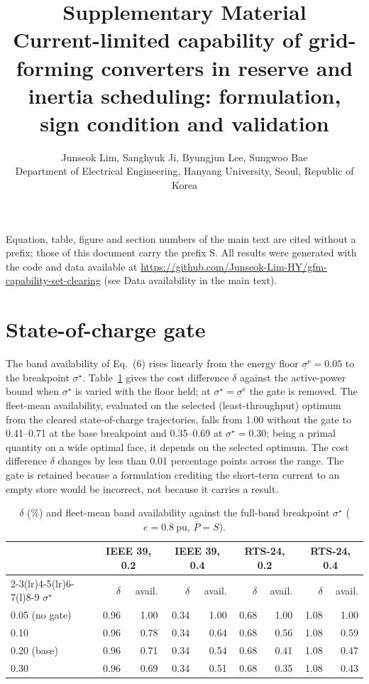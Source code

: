 \documentclass[11pt,a4paper]{article}
\title{Supplementary Material\\[4pt]
\large Current-limited capability of grid-forming converters in reserve and
inertia scheduling: formulation, sign condition and validation}
\author{Junseok Lim, Sanghyuk Ji, Byungjun Lee, Sungwoo Bae\\
\small Department of Electrical Engineering, Hanyang University, Seoul,
Republic of Korea}
\date{}
\newcommand{\pu}{\ensuremath{\mathrm{pu}}}
\begin{document}
\maketitle

Equation, table, figure and section numbers of the main text are cited
without a prefix; those of this document carry the prefix S. All results
were generated with the code and data available at
\url{https://github.com/Junseok-Lim-HY/gfm-capability-set-clearing} (see Data
availability in the main text).

\section{State-of-charge gate}
\label{s:gate}

The band availability of Eq.~(6) rises linearly from the energy floor
$\underline{\sigma}^{\mathrm{e}} = 0.05$ to the breakpoint
$\sigma^{\star}$. Table~\ref{tab:gate} gives the cost difference $\delta$
against the active-power bound when $\sigma^{\star}$ is varied with the floor
held; at $\sigma^{\star} = \underline{\sigma}^{\mathrm{e}}$ the gate is
removed. The fleet-mean availability, evaluated on the selected
(least-throughput) optimum from the cleared state-of-charge trajectories,
falls from \num{1.00} without the gate to \numrange{0.41}{0.71} at the base
breakpoint and \numrange{0.35}{0.69} at $\sigma^{\star} = 0.30$; being a
primal quantity on a wide optimal face, it depends on the selected optimum.
The cost difference $\delta$ changes by less than \num{0.01} percentage
points across the range. The gate is retained because a formulation crediting the
short-term current to an empty store would be incorrect, not because it
carries a result.

\begin{table}[h]
  \caption{$\delta$ (\%) and fleet-mean band availability against the
  full-band breakpoint $\sigma^{\star}$ ($e = \SI{0.8}{\pu}$,
  $\bar{P} = S$).}
  \label{tab:gate}
  \centering
  \begin{tabular}{l rr rr rr rr}
    \toprule
    & \multicolumn{2}{c}{IEEE 39, 0.2} & \multicolumn{2}{c}{IEEE 39, 0.4}
    & \multicolumn{2}{c}{RTS-24, 0.2} & \multicolumn{2}{c}{RTS-24, 0.4} \\
    \cmidrule(lr){2-3}\cmidrule(lr){4-5}\cmidrule(lr){6-7}\cmidrule(l){8-9}
    $\sigma^{\star}$ & $\delta$ & avail. & $\delta$ & avail.
      & $\delta$ & avail. & $\delta$ & avail. \\
    \midrule
    0.05 (no gate) & 0.96 & 1.00 & 0.34 & 1.00 & 0.68 & 1.00 & 1.08 & 1.00 \\
    0.10           & 0.96 & 0.78 & 0.34 & 0.64 & 0.68 & 0.56 & 1.08 & 0.59 \\
    0.20 (base)    & 0.96 & 0.71 & 0.34 & 0.54 & 0.68 & 0.41 & 1.08 & 0.47 \\
    0.30           & 0.96 & 0.69 & 0.34 & 0.51 & 0.68 & 0.35 & 1.08 & 0.43 \\
    \bottomrule
  \end{tabular}
\end{table}
\end{document}
